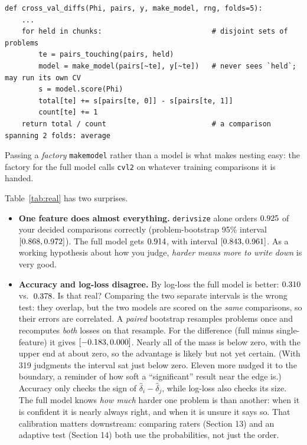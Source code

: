 \documentclass[11pt]{article}
\theoremstyle{definition}
\theoremstyle{plain}
\theoremstyle{remark}
\newcommand{\code}[1]{\texttt{#1}}
\renewcommand{\_}{\oldunderscore\allowbreak}
\newcommand{\file}[1]{\textcolor{blue!50!black}{\texttt{#1}}}
\newcommand{\codefrom}[1]{\par\smallskip\noindent{\footnotesize\textbf{From} \file{#1}}}
\begin{document}
\codefrom{src/calcdiff/evaluate.py}
\begin{lstlisting}
def cross_val_diffs(Phi, pairs, y, make_model, rng, folds=5):
    ...
    for held in chunks:                          # disjoint sets of problems
        te = pairs_touching(pairs, held)
        model = make_model(pairs[~te], y[~te])   # never sees `held`; may run its own CV
        s = model.score(Phi)
        total[te] += s[pairs[te, 0]] - s[pairs[te, 1]]
        count[te] += 1
    return total / count                         # a comparison spanning 2 folds: average
\end{lstlisting}
Passing a \emph{factory} \code{make\_model} rather than a model is what makes nesting easy: the factory for the full model calls
\code{cv\_l2} on whatever training comparisons it is handed.

\begin{table}[h]\centering\small

\caption{Out-of-fold accuracy and log-loss on your labels. Single-feature models are one-parameter Bradley--Terry fits.}\label{tab:real}
\end{table}

Table~\ref{tab:real} has two surprises.
\begin{itemize}[nosep]
\item \textbf{One feature does almost everything.} \code{deriv\_size} alone orders $0.925$ of your decided comparisons correctly
  (problem-bootstrap 95\% interval $[0.868,0.972]$). The full model gets $0.914$, with interval $[0.843,0.961]$.
  As a working hypothesis about how you judge, \emph{harder means more to write down} is very good.
\item \textbf{Accuracy and log-loss disagree.} By log-loss the full model is better: $0.310$ vs.\ $0.378$. Is that real? Comparing the two
  separate intervals is the wrong test: they overlap, but the two models are scored on the \emph{same} comparisons, so their errors are correlated. A \emph{paired}
  bootstrap resamples problems once and recomputes \emph{both} losses on that resample. For the difference (full minus single-feature) it gives
  $[-0.183,0.000]$. Nearly all of the mass is below zero, with the upper end at about zero, so the advantage is likely but not yet certain.
  (With 319 judgments the interval sat just below zero. Eleven more nudged it to the boundary, a reminder of how soft a ``significant'' result near the edge is.)
  Accuracy only checks the sign of $\hat\delta_i-\hat\delta_j$, while log-loss also checks its size.
  The full model knows \emph{how much} harder one problem is than another: when it is confident it is nearly always right, and when it is unsure it says so.
  That calibration matters downstream: comparing raters (Section 13) and an adaptive test (Section 14) both use the probabilities, not just the order.
\end{itemize}
\end{document}
